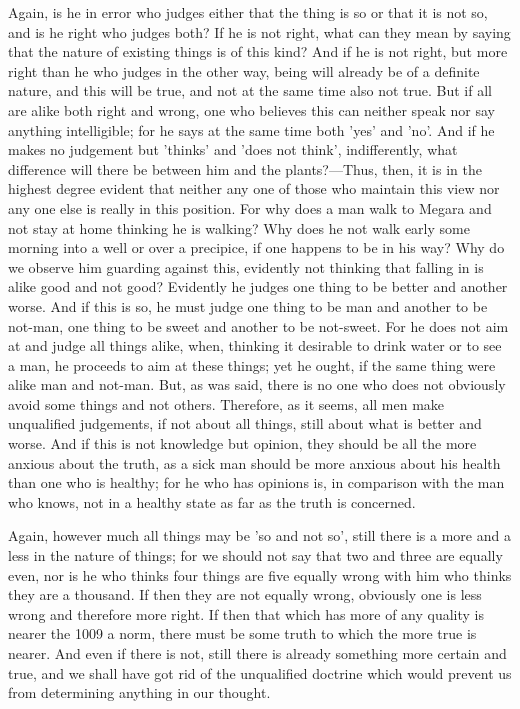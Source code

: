 Again, is he in error who judges either that the thing is so or that it is not so, and is he right who judges both? If he is not right, what can they mean by saying that the nature of existing things is of this kind? And if he is not right, but more right than he who judges in the other way, being will already be of a definite nature, and this will be true, and not at the same time also not true. But if all are alike both right and wrong, one who believes this can neither speak nor say anything intelligible; for he says at the same time both 'yes' and 'no'. And if he makes no judgement but 'thinks' and 'does not think', indifferently, what difference will there be between him and the plants?—Thus, then, it is in the highest degree evident that neither any one of those who maintain this view nor any one else is really in this position. For why does a man walk to Megara and not stay at home thinking he is walking? Why does he not walk early some morning into a well or over a precipice, if one happens to be in his way? Why do we observe him guarding against this, evidently not thinking that falling in is alike good and not good? Evidently he judges one thing to be better and another worse. And if this is so, he must judge one thing to be man and another to be not-man, one thing to be sweet and another to be not-sweet. For he does not aim at and judge all things alike, when, thinking it desirable to drink water or to see a man, he proceeds to aim at these things; yet he ought, if the same thing were alike man and not-man. But, as was said, there is no one who does not obviously avoid some things and not others. Therefore, as it seems, all men make unqualified judgements, if not about all things, still about what is better and worse. And if this is not knowledge but opinion, they should be all the more anxious about the truth, as a sick man should be more anxious about his health than one who is healthy; for he who has opinions is, in comparison with the man who knows, not in a healthy state as far as the truth is concerned.

Again, however much all things may be 'so and not so', still there is a more and a less in the nature of things; for we should not say that two and three are equally even, nor is he who thinks four things are five equally wrong with him who thinks they are a thousand. If then they are not equally wrong, obviously one is less wrong and therefore more right. If then that which has more of any quality is nearer the 1009 a norm, there must be some truth to which the more true is nearer. And even if there is not, still there is already something more certain and true, and we shall have got rid of the unqualified doctrine which would prevent us from determining anything in our thought.

